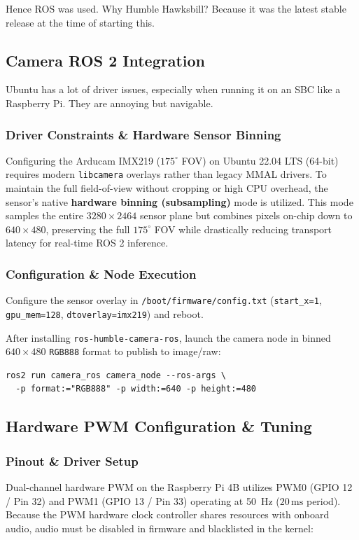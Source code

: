\documentclass[12pt,a4paper]{article}
\begin{document}
Hence ROS was used. Why Humble Hawksbill? Because it was the latest stable release at the time of starting this. \\

\subsection{Camera ROS 2 Integration}

Ubuntu has a lot of driver issues, especially when running it on an SBC like a Raspberry Pi. They are annoying but navigable.

\subsubsection*{Driver Constraints \& Hardware Sensor Binning}
Configuring the Arducam IMX219 ($175^\circ$ FOV) on Ubuntu 22.04 LTS (64-bit) requires modern \texttt{libcamera} overlays rather than legacy MMAL drivers. To maintain the full field-of-view without cropping or high CPU overhead, the sensor's native \textbf{hardware binning (subsampling)} mode is utilized. This mode samples the entire $3280 \times 2464$ sensor plane but combines pixels on-chip down to $640 \times 480$, preserving the full $175^\circ$ FOV while drastically reducing transport latency for real-time ROS 2 inference.

\subsubsection*{Configuration \& Node Execution}
Configure the sensor overlay in \texttt{/boot/firmware/config.txt} (\texttt{start\_x=1}, \texttt{gpu\_mem=128}, \texttt{dtoverlay=imx219}) and reboot. 

After installing \texttt{ros-humble-camera-ros}, launch the camera node in binned $640 \times 480$ \texttt{RGB888} format to publish to  image/raw:
\begin{verbatim}
ros2 run camera_ros camera_node --ros-args \
  -p format:="RGB888" -p width:=640 -p height:=480
\end{verbatim}

\subsection{Hardware PWM Configuration \& Tuning}

\subsubsection*{Pinout \& Driver Setup}
Dual-channel hardware PWM on the Raspberry Pi 4B utilizes PWM0 (GPIO 12 / Pin 32) and PWM1 (GPIO 13 / Pin 33) operating at 50~Hz ($20\,\text{ms}$ period). Because the PWM hardware clock controller shares resources with onboard audio, audio must be disabled in firmware and blacklisted in the kernel:
\end{document}
